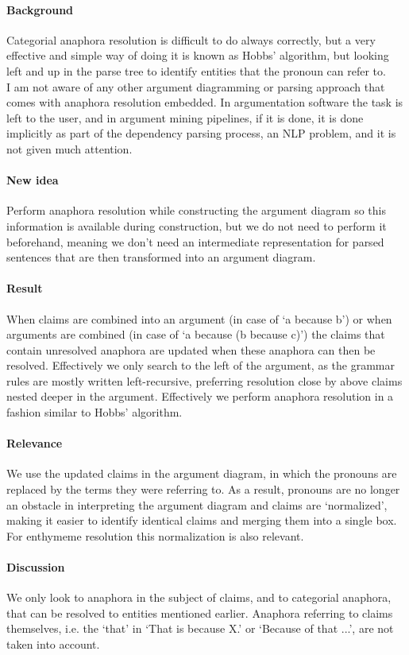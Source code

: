 \documentclass{article}
\begin{document}
\paragraph{Background} Categorial anaphora resolution is difficult to do always correctly, but a very effective and simple way of doing it is known as Hobbs' algorithm, but looking left and up in the parse tree to identify entities that the pronoun can refer to.\\
I am not aware of any other argument diagramming or parsing approach that comes with anaphora resolution embedded. In argumentation software the task is left to the user, and in argument mining pipelines, if it is done, it is done implicitly as part of the dependency parsing process, an NLP problem, and it is not given much attention.
\paragraph{New idea} Perform anaphora resolution while constructing the argument diagram so this information is available during construction, but we do not need to perform it beforehand, meaning we don't need an intermediate representation for parsed sentences that are then transformed into an argument diagram.
\paragraph{Result} When claims are combined into an argument (in case of `a because b') or when arguments are combined (in case of `a because (b because c)') the claims that contain unresolved anaphora are updated when these anaphora can then be resolved. Effectively we only search to the left of the argument, as the grammar rules are mostly written left-recursive, preferring resolution close by above claims nested deeper in the argument. Effectively we perform anaphora resolution in a fashion similar to Hobbs' algorithm.
\paragraph{Relevance} We use the updated claims in the argument diagram, in which the pronouns are replaced by the terms they were referring to. As a result, pronouns are no longer an obstacle in interpreting the argument diagram and claims are `normalized', making it easier to identify identical claims and merging them into a single box. For enthymeme resolution this normalization is also relevant.
\paragraph{Discussion} We only look to anaphora in the subject of claims, and to categorial anaphora, that can be resolved to entities mentioned earlier. Anaphora referring to claims themselves, i.e. the `that' in `That is because X.' or `Because of that ...', are not taken into account.
\end{document}

